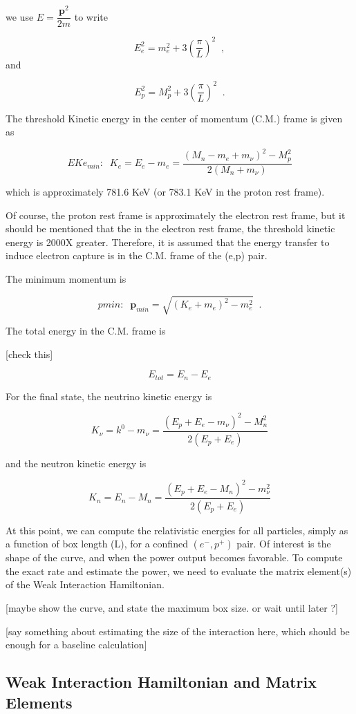 \documentclass[11pt]{amsart}
\begin{document}
we use $E=\dfrac{\mathbf{p}^{2}}{2m}$ to write

$$E^{2}_{e}=m^{2}_{e}+3\left(\dfrac{\pi}{L}\right)^{2}\;\;,$$ and

$$E^{2}_{p}=M^{2}_{p}+3\left(\dfrac{\pi}{L}\right)^{2}\;\;.$$

The threshold Kinetic energy in the center of momentum (C.M.) frame is given as

$$EKe_{min}:\;\;K_{e}=E_{e}-m_{e}=\dfrac{(M_{n}-m_{e}+m_{\nu})^{2}-M^{2}_{p}}{2(M_{n}+m_{\nu})}$$

which is approximately 781.6 KeV (or 783.1 KeV in the proton rest frame).

Of course, the proton rest frame is approximately the electron rest frame, but it should be mentioned that the in the electron rest frame, the threshold kinetic energy is 2000X greater.  Therefore, it is assumed that the energy transfer to induce electron capture is in the C.M. frame of the (e,p) pair.
 
The minimum momentum is 

$$pmin:\;\;\mathbf{p}_{min}=\sqrt{(K_{e}+m_{e})^{2}-m_{e}^{2}}\;\;.$$

The total energy in the C.M. frame is 

[check this]

$$E_{tot}=E_{n}-E_{e}$$

For the final state, the neutrino kinetic energy is

$$K_{\nu}=k^{0}-m_{\nu}=\dfrac{(E_{p}+E_{e}-m_{\nu})^{2}-M^{2}_{n}}{2(E_{p}+E_{e})}$$

and the neutron kinetic energy is

$$K_{n}=E_{n}-M_{n}=\dfrac{(E_{p}+E_{e}-M_{n})^{2}-m^{2}_{\nu}}{2(E_{p}+E_{e})}$$

At this point, we can compute the relativistic energies for all particles, simply as a function of box length (L), for a confined $(e^{-},p^{+})$ pair.  Of interest is the shape of the curve, and when the power output becomes favorable.  To compute the exact rate and estimate the power, we need to evaluate the matrix element(s) of the Weak Interaction Hamiltonian.  

[maybe show the curve, and state the maximum box size. or wait until later ?]  

[say something about estimating the size of the interaction here, which should be enough for a baseline calculation]


\subsection{Weak Interaction Hamiltonian and Matrix Elements}
\end{document}
